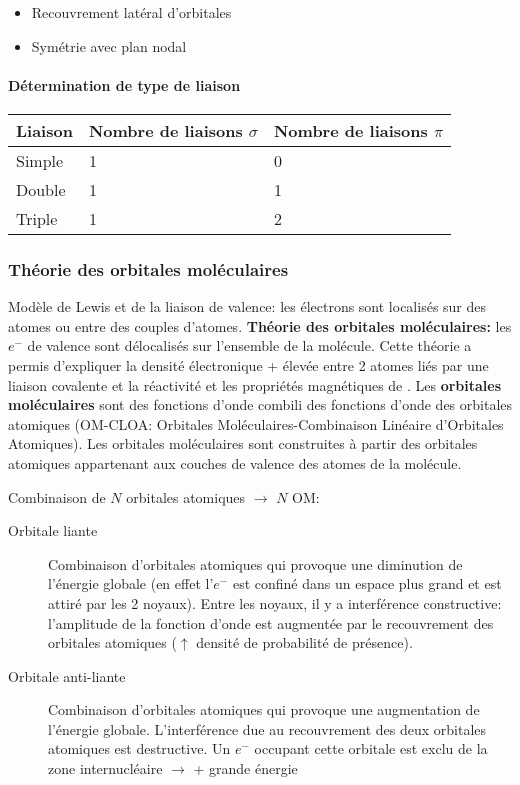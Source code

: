\begin{itemize}
  \item Recouvrement latéral d'orbitales
  \item Symétrie avec plan nodal
\end{itemize}

\paragraph{Détermination de type de liaison}

\begin{center}
  \begin{tabular}{l|ll}
    Liaison & Nombre de liaisons $\sigma$ & Nombre de liaisons $\pi$\\
    \hline
    Simple & 1 & 0\\ %
    Double & 1 & 1\\
    Triple & 1 & 2\\
  \end{tabular}
\end{center}

\subsubsection{Théorie des orbitales moléculaires}
Modèle de Lewis et de la liaison de valence: les électrons sont localisés sur des atomes ou entre des couples d'atomes.
\textbf{Théorie des orbitales moléculaires:} les $e^-$ de valence sont délocalisés sur l'ensemble de la molécule.
Cette théorie a permis d'expliquer la densité électronique + élevée entre 2 atomes liés par une liaison covalente et la réactivité et les propriétés magnétiques de .
Les \textbf{orbitales moléculaires} sont des fonctions d'onde combili des fonctions d'onde des orbitales atomiques (OM-CLOA: Orbitales Moléculaires-Combinaison Linéaire d'Orbitales Atomiques).
Les orbitales moléculaires sont construites à partir des orbitales atomiques appartenant aux couches de valence des atomes de la molécule.

Combinaison de $N$ orbitales atomiques $\rightarrow$ $N$ OM:
\begin{description}
  \item[Orbitale liante] Combinaison d'orbitales atomiques qui provoque une diminution de l'énergie globale (en effet l'$e^-$ est confiné dans un espace plus grand et est attiré par les 2 noyaux).
    Entre les noyaux,
    il y a interférence constructive: l'amplitude de la fonction d'onde est augmentée par le recouvrement des orbitales atomiques ($\uparrow$ densité de probabilité de présence).

  \item[Orbitale anti-liante] Combinaison d'orbitales atomiques qui provoque une augmentation de l'énergie globale.
    L'interférence due au recouvrement des deux orbitales atomiques est destructive.
    Un $e^-$ occupant cette orbitale est exclu de la zone internucléaire $\rightarrow$ + grande énergie
\end{description}

